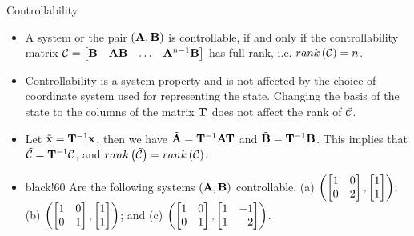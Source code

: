 \documentclass[aspectratio=169]{beamer}
\def\mf{\ensuremath\mathbf}
\def\lp{\ensuremath\left(}
\def\rp{\ensuremath\right)}
\def\bmx{\ensuremath\begin{bmatrix*}[r]}
\def\emx{\ensuremath\end{bmatrix*}}
\newcommand{\demoex}[2]{\onslide<#1->\begin{color}{black!60} #2 \end{color}}
\newcommand{\ct}[1]{\lp #1\rp}
\begin{document}
\begin{frame}[t]{Controllability}
\begin{itemize}
    \item A system or the pair $\ct{\mf{A}, \mf{B}}$ is controllable, if and only if the controllability matrix $\mathcal{C} = \bmx \mf{B} & \mf{A}\mf{B} & \ldots & \mf{A}^{n-1}\mf{B} \emx$ has full rank, i.e. $rank\ct{\mathcal{C}} = n$.

    \item Controllability is a system property and is not affected by the choice of coordinate system used for representing the state. Changing the basis of the state to the columns of the matrix $\mf{T}$ does not affect the rank of $\mathcal{C}$.

    \item Let $\tilde{\mf{x}} = \mf{T}^{-1}\mf{x}$, then we have $\tilde{\mf{A}} = \mf{T}^{-1}\mf{A}\mf{T}$ and $\tilde{\mf{B}} = \mf{T}^{-1}\mf{B}$. This implies that $\tilde{\mathcal{C}} = \mf{T}^{-1}\mathcal{C}$,  and $rank\ct{\tilde{\mathcal{C}}} = rank\ct{\mathcal{C}}$.
    
    \item \demoex{2}{\small Are the following systems $\ct{\mf{A}, \mf{B}}$ controllable. (a) $\ct{\bmx 1 & 0 \\ 0 & 2 \emx, \bmx 1 \\ 1\emx}$; (b) $\ct{\bmx 1 & 0 \\ 0 & 1 \emx, \bmx 1 \\ 1\emx}$; and (c) $\ct{\bmx 1 & 0 \\ 0 & 1 \emx, \bmx 1 & -1\\ 1 & 2\emx}$.}
\end{itemize}
\end{frame}
 
\end{document}

